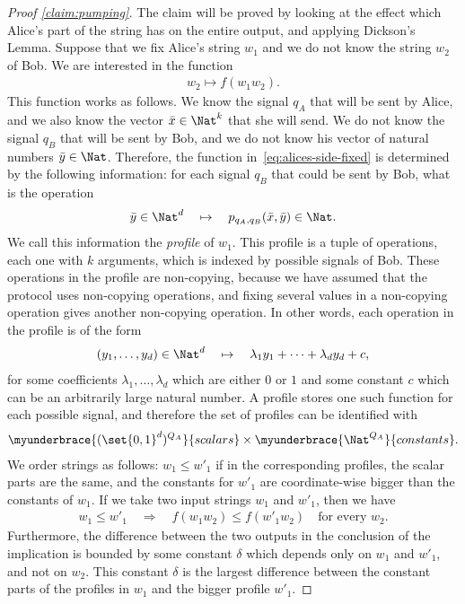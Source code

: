 \begin{proof}[Proof \cref{claim:pumping}]
    The claim will be proved by looking at the effect which Alice's part of the string has on the entire output, and applying Dickson's Lemma.
    Suppose that we fix Alice's string $w_1$ and we do not know the string $w_2$ of Bob. We are interested in the function 
    \begin{align}\label{eq:alices-side-fixed}
    w_2 \mapsto f(w_1 w_2).
    \end{align}
    This function works as follows. We know the signal $q_A$ that will be sent by Alice, and we also know the vector $\bar x \in \Nat^k$  that she will send. We do not know the signal $q_B$ that will be sent by Bob, and we do not know his vector of natural numbers $\bar y \in \Nat$. Therefore, the function in~\eqref{eq:alices-side-fixed}  is determined by the following information: for each signal $q_B$ that could be sent by Bob, what is the operation 
    \begin{align}\label{eq:profile-operation}
    \bar y \in \Nat^d \quad \mapsto \quad p_{q_A,q_B}(\bar x, \bar y) \in \Nat.
    \end{align}
    We call this information the \emph{profile} of $w_1$. This profile is a tuple of operations, each one with $k$ arguments, which is indexed by possible signals of Bob. These operations in the profile are  non-copying, because we have assumed that the protocol uses non-copying operations, and fixing several values in a non-copying operation gives another non-copying operation. In other words, each operation in the profile is of the form 
    \begin{align*}
    (y_1,\ldots,y_d) \in \Nat^d 
    \quad \mapsto \quad 
    \lambda_1 y_1 + \cdots + \lambda_d y_d + c,
    \end{align*}
    for some coefficients $\lambda_1,\ldots,\lambda_d$ which are either $0$ or $1$ and some constant $c$ which can be an arbitrarily large natural number.  A profile stores one such function for each possible signal, and therefore the set of profiles can be identified with 
    \begin{align*}
        \myunderbrace{(\set{0,1}^d)^{Q_A}}{scalars} \times \myunderbrace{\Nat^{Q_A}}{constants}.
    \end{align*}
    We order strings as follows: $w_1 \le w'_1$ if in the corresponding profiles, the scalar parts are the same, and the constants for $w'_1$ are coordinate-wise bigger than the constants of $w_1$. If we take two input strings $w_1$ and $w'_1$, then we have 
    \begin{align}\label{eq:monotonicity}
    w_1 \leq w'_1
    \quad \Rightarrow \quad 
    f(w_1 w_2) \leq f(w'_1 w_2) \quad \text{for every $w_2$.}
    \end{align}
    Furthermore, the difference between the two outputs in the conclusion of the implication is bounded by some constant $\delta$ which depends only on $w_1$ and $w'_1$, and not on $w_2$. This constant $\delta$ is the largest difference between the constant parts of the profiles in $w_1$ and the bigger profile $w'_1$.


\end{proof}
